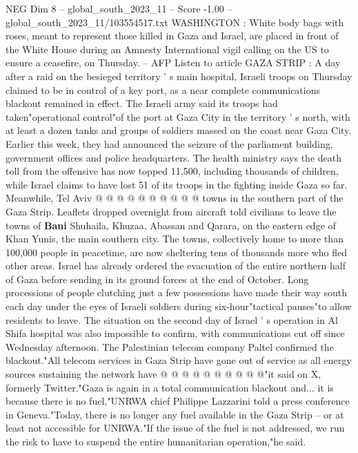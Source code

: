 \begin{textsample}{NEG Dim 8 – global\_south\_2023\_11 – Score -1.00 – global\_south\_2023\_11/103554517.txt}  \label{ex:f8_neg_189}
WASHINGTON : White body bags with roses, meant to represent those killed in Gaza and Israel, are placed in front of the White House during an Amnesty International vigil calling on the US to ensure a ceasefire, on Thursday. -- AFP Listen to article GAZA STRIP : A day after a raid on the besieged territory ' s main hospital, Israeli troops on Thursday claimed to be in control of a key port, as a near complete communications blackout remained in effect.
The Israeli army said its troops had taken"operational control"of the port at Gaza City in the territory ' s north, with at least a dozen tanks and groups of soldiers massed on the coast near Gaza City.
Earlier this week, they had announced the seizure of the parliament building, government offices and police headquarters.
The health ministry says the death toll from the offensive has now topped 11,500, including thousands of children, while Israel claims to have lost 51 of its troops in the fighting inside Gaza so far.
Meanwhile, Tel Aviv @ @ @ @ @ @ @ @ @ @ towns in the southern part of the Gaza Strip.
Leaflets dropped overnight from aircraft told civilians to leave the towns of \textbf{Bani} Shuhaila, Khuzaa, Abassan and Qarara, on the eastern edge of Khan Yunis, the main southern city.
The towns, collectively home to more than 100,000 people in peacetime, are now sheltering tens of thousands more who fled other areas.
Israel has already ordered the evacuation of the entire northern half of Gaza before sending in its ground forces at the end of October.
Long processions of people clutching just a few possessions have made their way south each day under the eyes of Israeli soldiers during six-hour"tactical pauses"to allow residents to leave.
The situation on the second day of Israel ' s operation in Al Shifa hospital was also impossible to confirm, with communications cut off since Wednesday afternoon.
The Palestinian telecom company Paltel confirmed the blackout."All telecom services in Gaza Strip have gone out of service as all energy sources sustaining the network have @ @ @ @ @ @ @ @ @ @"it said on X, formerly Twitter."Gaza is again in a total communication blackout and... it is because there is no fuel,"UNRWA chief Philippe Lazzarini told a press conference in Geneva."Today, there is no longer any fuel available in the Gaza Strip -- or at least not accessible for UNRWA."If the issue of the fuel is not addressed, we run the risk to have to suspend the entire humanitarian operation,"he said.

\end{textsample}
